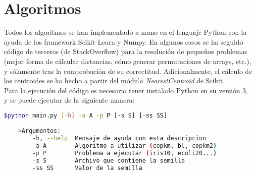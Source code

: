 \section{Algoritmos}


Todos los algoritmos se han implementado a mano en el lenguaje Python con la ayuda de los framework Scikit-Learn y Numpy. En algunos casos se ha seguido código de terceros (de StackOverflow) para la resolución de pequeños problemas (mejor forma de cálcular distancias, cómo generar permutaciones de arrays, etc.), y sólamente tras la comprobación de su correctitud. 
Adicionalmente, el cálculo de los centroides se ha hecho a partir del módulo \textit{NearestCentroid} de Scikit. \\

Para la ejecución del código es necesario tener instalado Python en su versión 3, y se puede ejecutar de la siguiente manera:
\begin{lstlisting}[language=bash]
    $python main.py [-h] -a A -p P [-s S] [-ss SS]

    >Argumentos:
        -h, --help  Mensaje de ayuda con esta descripcion
        -a A        Algoritmo a utilizar (copkm, bl, copkm2)
        -p P        Problema a ejecutar (iris10, ecoli20...)
        -s S        Archivo que contiene la semilla
        -ss SS      Valor de la semilla    
\end{lstlisting}

